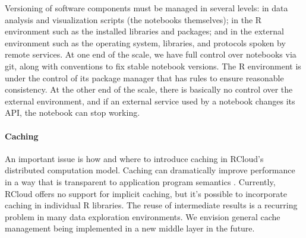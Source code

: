 Versioning of software components must be managed in several
levels: in data analysis and visualization scripts (the
notebooks themselves); in the R environment such as the installed
libraries and packages; and in the external environment such as the
operating system, libraries, and protocols spoken by remote
services. At one end of the scale, we have full control over notebooks
via git, along with conventions to fix stable notebook versions.
The R environment is under the control of its package manager that
has rules to ensure reasonable consistency.
At the other end of the scale, there is basically no
control over the external environment, and if an external service 
used by a notebook changes its API, the notebook can stop working.


\paragraph*{Caching}
An important issue is how and where to introduce caching in
RCloud's distributed computation model. Caching can dramatically
improve performance in a way that is transparent to
application program semantics \cite{Callahan:2006:VVM, Guo:2010:TPI}.
Currently, RCloud offers no support for implicit caching, but 
it's possible to incorporate caching in individual R libraries.
The reuse of intermediate results is a recurring problem
in many data exploration environments.
We envision general cache management being implemented in a
new middle layer in the future.

